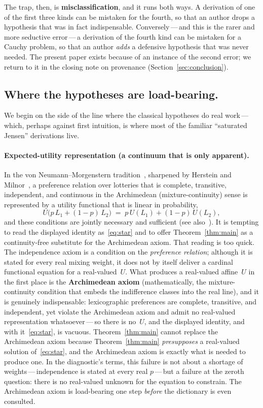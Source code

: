 \documentclass{article}
\theoremstyle{plain}
\theoremstyle{definition}
\begin{document}
The trap, then, is \textbf{misclassification}, and it runs both ways. A derivation of one of the first three kinds can be
mistaken for the fourth, so that an author drops a hypothesis that was
in fact indispensable. Conversely\,---\,and this is the rarer and more
seductive error\,---\,a derivation of the fourth kind can be mistaken
for a Cauchy problem, so that an author \emph{adds} a defensive
hypothesis that was never needed. The present paper exists because of
an instance of the second error; we return to it in the closing note
on provenance (Section~\ref{sec:conclusion}).

\subsection{Where the hypotheses are load-bearing.}
\label{ssec:load-bearing}

We begin on the side of the line where the classical hypotheses do real work\,---\,which, perhaps against first intuition, is where most
of the familiar ``saturated Jensen'' derivations live.

\paragraph{Expected-utility representation (a continuum that is only apparent).}
In the von Neumann--Morgenstern tradition~\cite{vNM1944}, sharpened by
Herstein and Milnor~\cite{HersteinMilnor1953}, a preference relation
over lotteries that is complete, transitive, independent, and
continuous in the Archimedean (mixture-continuity) sense is represented
by a utility functional that is linear in probability,
\[
U\bigl(p\,L_1+(1-p)\,L_2\bigr)\;=\;p\,U(L_1)+(1-p)\,U(L_2),
\]
and these conditions are jointly necessary and sufficient (see
also~\cite{Fishburn1970, Kreps1988}). It is tempting to read the
displayed identity as~\eqref{eq:star} and to offer
Theorem~\ref{thm:main} as a continuity-free substitute for the
Archimedean axiom. That reading is too quick. The
independence axiom is a condition on the \emph{preference relation};
although it is stated for every real mixing weight, it does not by
itself deliver a cardinal functional equation for a real-valued~$U$.
What produces a real-valued affine~$U$ in the first place is the
\textbf{Archimedean axiom} (mathematically, the mixture-continuity
condition that embeds the indifference classes into the real line), and
it is genuinely indispensable:
lexicographic preferences are complete, transitive, and independent,
yet violate the Archimedean axiom and admit no real-valued
representation whatsoever\,---\,so there is no~$U$, and the displayed
identity, and with it~\eqref{eq:star}, is vacuous.
Theorem~\ref{thm:main} cannot replace the Archimedean axiom because
Theorem~\ref{thm:main} \emph{presupposes} a real-valued solution
of~\eqref{eq:star}, and the Archimedean axiom is exactly what is
needed to produce one. In the diagnostic's terms, this failure is not about a shortage of weights\,---\,independence is stated at every real $p$\,---\,but a
failure at the zeroth question: there is no real-valued unknown for the
equation to constrain. The Archimedean axiom is load-bearing one step
\emph{before} the dictionary is even consulted.
\end{document}
